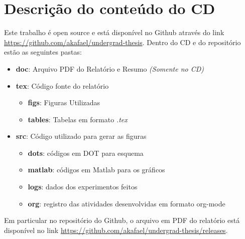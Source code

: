 \chapter{Descrição do conteúdo do CD}

\label{AnCD}

Este trabalho é open source e está disponível no Github através do link \url{https://github.com/akafael/undergrad-thesis}. Dentro do CD e do repositório estão as seguintes pastas:

\begin{itemize}
    \item \textbf{doc}: Arquivo PDF do Relatório e Resumo \textit{(Somente no CD)}
    \item \textbf{tex}: Código fonte do relatório
    \begin{itemize}
        \item \textbf{figs}: Figuras Utilizadas
        \item \textbf{tables}: Tabelas em formato \textit{.tex}
    \end{itemize}
    \item \textbf{src}: Código utilizado para gerar as figuras
    \begin{itemize}
        \item \textbf{dots}: códigos em DOT para esquema
        \item \textbf{matlab}: códigos em Matlab para os gráficos
        \item \textbf{logs}: dados dos experimentos feitos
        \item \textbf{org}: registro das atividades desenvolvidas em formato org-mode
        \end{itemize}
\end{itemize}

Em particular no repositório do Github, o arquivo em PDF do relatório está disponível no link \url{https://github.com/akafael/undergrad-thesis/releases}.

